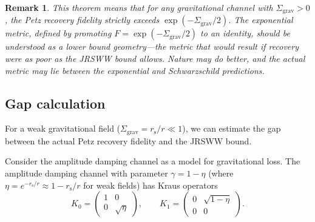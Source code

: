 \documentclass[aps,prd,preprint,superscriptaddress,longbibliography]{revtex4-2}
\newtheorem*{remark}{Remark}
\newcommand{\rs}{r_{\mathrm{s}}}
\newcommand{\Sgrav}{\Sigma_{\mathrm{grav}}}
\begin{document}
\begin{remark}
This theorem means that for any gravitational channel with
$\Sgrav > 0$, the Petz recovery fidelity strictly exceeds
$\exp(-\Sgrav/2)$.  The exponential metric, defined by promoting
$F = \exp(-\Sgrav/2)$ to an identity, should be understood as a
\emph{lower bound geometry}---the metric that would result if
recovery were as poor as the JRSWW bound allows.  Nature may do
better, and the actual metric may lie between the exponential and
Schwarzschild predictions.
\end{remark}

\subsection{Gap calculation}

For a weak gravitational field ($\Sgrav = \rs/r \ll 1$), we can
estimate the gap between the actual Petz recovery fidelity and the
JRSWW bound.

Consider the amplitude damping channel as a model for gravitational
loss.  The amplitude damping channel with parameter
$\gamma = 1 - \eta$ (where $\eta = e^{-\rs/r} \approx 1 - \rs/r$
for weak fields) has Kraus operators
\begin{equation}
  K_0 = \begin{pmatrix} 1 & 0 \\ 0 & \sqrt{\eta} \end{pmatrix},
  \qquad
  K_1 = \begin{pmatrix} 0 & \sqrt{1-\eta} \\ 0 & 0 \end{pmatrix}.
  \label{eq:AD_Kraus}
\end{equation}
\end{document}
